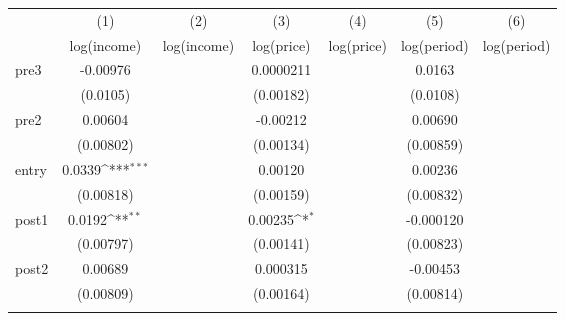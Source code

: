 {
\def\sym#1{\ifmmode^{#1}\else\(^{#1}\)\fi}
\begin{tabular}{l*{6}{c}}
\toprule
                    &\multicolumn{1}{c}{(1)}&\multicolumn{1}{c}{(2)}&\multicolumn{1}{c}{(3)}&\multicolumn{1}{c}{(4)}&\multicolumn{1}{c}{(5)}&\multicolumn{1}{c}{(6)}\\
                    &\multicolumn{1}{c}{log(income)}&\multicolumn{1}{c}{log(income)}&\multicolumn{1}{c}{log(price)}&\multicolumn{1}{c}{log(price)}&\multicolumn{1}{c}{log(period)}&\multicolumn{1}{c}{log(period)}\\
\midrule
pre3                &    -0.00976         &                     &   0.0000211         &                     &      0.0163         &                     \\
                    &    (0.0105)         &                     &   (0.00182)         &                     &    (0.0108)         &                     \\
\addlinespace
pre2                &     0.00604         &                     &    -0.00212         &                     &     0.00690         &                     \\
                    &   (0.00802)         &                     &   (0.00134)         &                     &   (0.00859)         &                     \\
\addlinespace
entry               &      0.0339\sym{***}&                     &     0.00120         &                     &     0.00236         &                     \\
                    &   (0.00818)         &                     &   (0.00159)         &                     &   (0.00832)         &                     \\
\addlinespace
post1               &      0.0192\sym{**} &                     &     0.00235\sym{*}  &                     &   -0.000120         &                     \\
                    &   (0.00797)         &                     &   (0.00141)         &                     &   (0.00823)         &                     \\
\addlinespace
post2               &     0.00689         &                     &    0.000315         &                     &    -0.00453         &                     \\
                    &   (0.00809)         &                     &   (0.00164)         &                     &   (0.00814)         &                     \\
\addlinespace

\end{tabular}}
